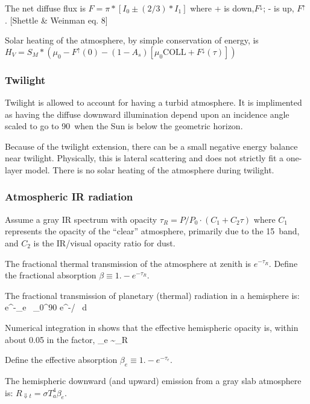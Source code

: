  The net diffuse flux is $ F = \pi* [I_0 \pm(2/3)*I_1]$ where  + is
 down,$F^\downarrow$;   - is up, $F^\uparrow$ .  [Shettle \& Weinman eq. 8]

Solar heating of the atmosphere, by simple conservation of energy, is 
 $ H_V = S_M*\left( \mu_0-F^\uparrow(0)-(1-A_s) 
\left[ \mu_0 \mathrm{COLL} +F^\downarrow(\tau) \right] \right) $

\subsubsection{Twilight \label{sec:twi}}
Twilight is allowed to account for having a turbid atmosphere. It is implimented
as having the diffuse downward illumination depend upon an incidence angle
scaled to go to 90\qd ~when the Sun is  below the geometric horizon. 

Because of the twilight extension, there can be a small negative energy balance near
twilight. Physically, this is lateral scattering and does not strictly fit a
one-layer model. There is no solar heating of the atmosphere during twilight.

\subsubsection{Atmospheric IR radiation}

Assume a gray IR spectrum with opacity  $\tau_R =P/P_0 \cdot (C_1+C_2\tau)$
where $C_1$ represents the opacity of the ``clear'' atmosphere, primarily due to
the 15\um ~band, and $C_2$ is the IR/visual opacity ratio for dust.

The fractional thermal transmission of the atmosphere at zenith is
$e^{-\tau_R}$. Define the fractional absorption $\beta \equiv 1. -e^{-\tau_R}$.


The fractional transmission of planetary (thermal) radiation in a hemisphere is:
\qbn  e^{-\tau_e} \equiv\
  \int_0^{90} e^{-\tau/\cos \theta} \cos \theta \sin \theta  \ d \theta \qen

Numerical integration in  shows that the effective
hemispheric opacity is, within about 0.05 in the factor,  
\qbn  \tau_e \sim {} \tau_R \qen

 Define the effective absorption $\beta_e \equiv 1. -e^{-\tau_e}$.

The hemispheric downward (and upward) emission from a gray slab atmosphere is:
$ R_{\Downarrow t} =\sigma T_a^4 \beta_e$.

